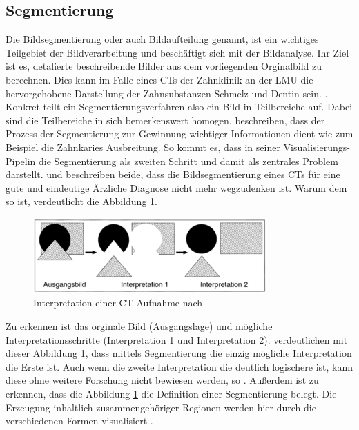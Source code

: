 \subsection{Segmentierung}
\label{subsec:segmentierung} Die Bildsegmentierung oder auch Bildaufteilung
genannt, ist ein wichtiges Teilgebiet der Bildverarbeitung und beschäftigt sich mit
der Bildanalyse. Ihr Ziel ist es, detalierte beschreibende Bilder aus dem vorliegenden
Orginalbild zu berechnen. Dies kann im Falle eines \ac{CT}s der Zahnklinik an
der \ac{LMU} die hervorgehobene Darstellung der Zahnsubstanzen Schmelz und Dentin
sein. \citep[vgl.][S.~359]{lehmann2013bildverarbeitung}. Konkret teilt ein
Segmentierungsverfahren also ein Bild in Teilbereiche auf. Dabei sind die Teilbereiche
in sich bemerkenswert homogen. \citet[S.~1]{ramesh2021} beschreiben, dass der
Prozess der Segmentierung zur Gewinnung wichtiger Informationen dient wie zum
Beispiel die Zahnkaries Ausbreitung. So kommt es, dass \citet[S.~50]{handels2000}
in seiner Visualisierungs-Pipelin die Segmentierung als zweiten Schritt und damit
als zentrales Problem darstellt. \citet[S.~95]{handels2000} und \citet[S.~360]{lehmann2013bildverarbeitung}
beschreiben beide, dass die Bildsegmentierung eines \ac{CT}s für eine gute und eindeutige
Ärzliche Diagnose nicht mehr wegzudenken ist. Warum dem so ist, verdeutlicht die
Abbildung \ref{fig:interpretation_einer_ct_aufnahem}.

\begin{figure}[h]
	\centering
	\includegraphics[width=0.8\textwidth]{img/bild_interpretation.jpg}
	\caption{Interpretation einer \ac{CT}-Aufnahme nach \citet[S.~360]{lehmann2013bildverarbeitung}}
	\label{fig:interpretation_einer_ct_aufnahem}
\end{figure}

Zu erkennen ist das orginale Bild (Ausgangslage) und mögliche
Interpretationsschritte (Interpretation 1 und Interpretation 2). \citet[S.~360]{lehmann2013bildverarbeitung}
verdeutlichen mit dieser Abbildung \ref{fig:interpretation_einer_ct_aufnahem}, dass
mittels Segmentierung die einzig mögliche Interpretation die Erste ist. Auch
wenn die zweite Interpretation die deutlich logischere ist, kann diese ohne weitere
Forschung nicht bewiesen werden, so \citet[S.~360]{lehmann2013bildverarbeitung}.
Außerdem ist zu erkennen, dass die Abbildung \ref{fig:interpretation_einer_ct_aufnahem}
die Definition einer Segmentierung belegt. Die Erzeugung inhaltlich
zusammengehöriger Regionen werden hier durch die verschiedenen Formen
visualisiert \citep[vgl.][S.~360]{lehmann2013bildverarbeitung}.

